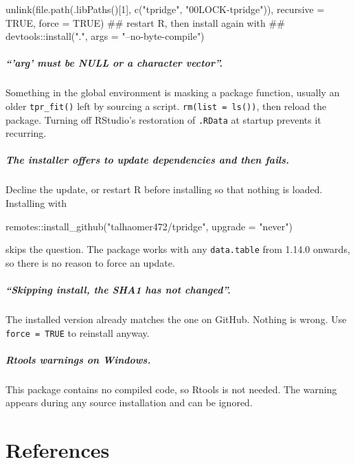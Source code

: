 \documentclass[11pt,a4paper]{report}
\begin{document}
\begin{Rblock}
unlink(file.path(.libPaths()[1], c("tpridge", "00LOCK-tpridge")),
       recursive = TRUE, force = TRUE)
## restart R, then install again with
##   devtools::install(".", args = "--no-byte-compile")
\end{Rblock}

\paragraph{``'arg' must be NULL or a character vector''.}
Something in the global environment is masking a package function,
usually an older \texttt{tpr\_fit()} left by sourcing a script.
\texttt{rm(list = ls())}, then reload the package. Turning off
RStudio's restoration of \texttt{.RData} at startup prevents it
recurring.

\paragraph{The installer offers to update dependencies and then fails.}
Decline the update, or restart R before installing so that nothing is
loaded. Installing with

\begin{Rblock}
remotes::install_github("talhaomer472/tpridge", upgrade = "never")
\end{Rblock}

skips the question. The package works with any \texttt{data.table} from
1.14.0 onwards, so there is no reason to force an update.

\paragraph{``Skipping install, the SHA1 has not changed''.}
The installed version already matches the one on GitHub. Nothing is
wrong. Use \texttt{force = TRUE} to reinstall anyway.

\paragraph{Rtools warnings on Windows.}
This package contains no compiled code, so Rtools is not needed. The
warning appears during any source installation and can be ignored.

\chapter{References}
\end{document}
